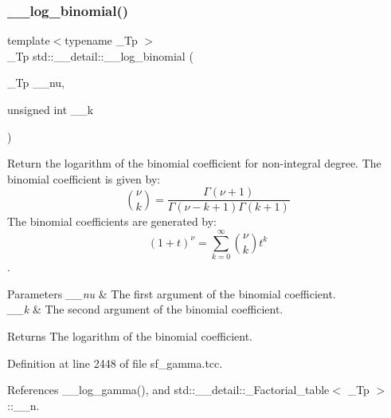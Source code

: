 \subsubsection{\texorpdfstring{\+\_\+\+\_\+log\+\_\+binomial()}{\_\_log\_binomial()}\hspace{0.1cm}{\footnotesize\ttfamily [2/2]}}
{\footnotesize\ttfamily template$<$typename \+\_\+\+Tp $>$ \\
\+\_\+\+Tp std\+::\+\_\+\+\_\+detail\+::\+\_\+\+\_\+log\+\_\+binomial (\begin{DoxyParamCaption}\item[{\+\_\+\+Tp}]{\+\_\+\+\_\+nu,  }\item[{unsigned int}]{\+\_\+\+\_\+k }\end{DoxyParamCaption})}



Return the logarithm of the binomial coefficient for non-\/integral degree. The binomial coefficient is given by\+: \[ \binom{\nu}{k} = \frac{\Gamma(\nu+1)}{\Gamma(\nu-k+1) \Gamma(k+1)} \] The binomial coefficients are generated by\+: \[ \left(1 + t\right)^\nu = \sum_{k=0}^\infty \binom{\nu}{k} t^k \]. 


\begin{DoxyParams}{Parameters}
{\em \+\_\+\+\_\+nu} & The first argument of the binomial coefficient. \\
\hline
{\em \+\_\+\+\_\+k} & The second argument of the binomial coefficient. \\
\hline
\end{DoxyParams}
\begin{DoxyReturn}{Returns}
The logarithm of the binomial coefficient. 
\end{DoxyReturn}


Definition at line 2448 of file sf\+\_\+gamma.\+tcc.



References \+\_\+\+\_\+log\+\_\+gamma(), and std\+::\+\_\+\+\_\+detail\+::\+\_\+\+Factorial\+\_\+table$<$ \+\_\+\+Tp $>$\+::\+\_\+\+\_\+n.

\mbox{\label{namespacestd_1_1____detail_aa89a8a5ced6325e1d64782f84e4ad95d}} 
